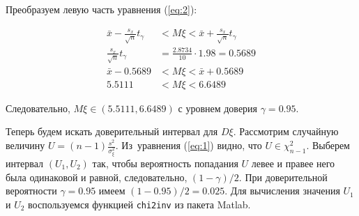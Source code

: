 \documentclass{report}
\begin{document}




Преобразуем левую часть уравнения (\ref{eq:2}):

\begin{equation*}
\begin{split}
\bar x - \frac{s_x}{\sqrt{n}}t_\gamma & < M\xi < \bar x + \frac{s_x}{\sqrt{n}}t_\gamma \\
\frac{s_x}{\sqrt{n}}t_\gamma & = \frac{2.8734}{10} \cdot 1.98 = 0.5689 \\
             \bar x - 0.5689 & < M\xi < \bar x + 0.5689 \\
             5.5111          & < M\xi < 6.6489
\end{split}
\end{equation*}

Следовательно, $M\xi \in \left ( 5.5111, 6.6489 \right )$ с уровнем доверия $\gamma = 0.95$.

Теперь будем искать доверительный интервал для $D\xi$. Рассмотрим случайную величину $U = (n-1)\frac{s^2}{\sigma_\xi^2}$. Из~уравнения (\ref{eq:1}) видно, что $U \in \chi^2_{n-1}$. Выберем интервал $(U_1, U_2)$ так, чтобы вероятность попадания $U$ левее и правее него была одинаковой и равной, следовательно, $(1 - \gamma)/2$. При доверительной вероятности $\gamma = 0.95$ имеем $(1 - 0.95)/2 = 0.025$. Для вычисления значения $U_1$ и $U_2$ воспользуемся функцией \lstinline{chi2inv} из пакета Matlab. 
\end{document}
